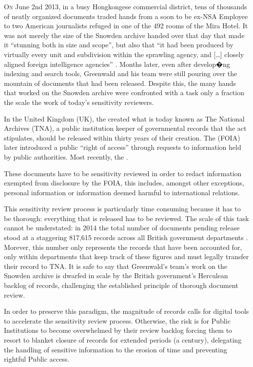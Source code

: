 \documentclass[\version]{l4proj}
\begin{document}
\lettrine[lines=3,nindent=0em]{O}{n} June 2nd 2013, in a busy Hongkongese commercial district, tens of thousands of neatly organized documents traded hands from a soon to be ex-NSA Employee to two American journalists refuged in one of the 492 rooms of the Mira Hotel.
It was not merely the size of the Snowden archive handed over that day that made it ``stunning both in size and scope'', but also that ``it had been produced by virtually every unit and subdivision within the sprawling agency, and [\ldots] closely aligned foreign intelligence agencies'' \autocite[77]{greenwaldNoPlaceHide2014}.
Months later, even after develop�ng indexing and search tools, Greenwald and his team were still pouring over the mountain of documents that had been released.
Despite this, the many hands that worked on the Snowden archive were confronted with a task only a fraction the scale the work of today's sensitivity reviewers.

In the United Kingdom (UK), the \textcite{PublicRecordsAct1958} created what is today known as The National Archives (TNA), a public institution keeper of governmental records that the act stipulates, should be released within thirty years of their creation.
The \textcite{FreedomInformationAct2000} (FOIA) later introduced a public ``right of access'' through requests to information held by public authorities.
Most recently, the \textcite{ConstitutionalReformGovernance2010}.

These documents have to be sensitivity reviewed in order to redact information exempted from disclosure by the FOIA, this includes, amongst other exceptions, personal information or information deemed harmful to international relations.

This sensitivity review process is particularly time consuming because it has to be thorough: everything that is released has to be reviewed.
The scale of this task cannot be understated: in 2014 the total number of documents pending release stood at a staggering 817,615 records across all British government departments \autocite{allanRecordsReview2014,thenationalarchivesRecordTransferReport2014}.
Morever, this number only represents the records that have been accounted for, only within departments that keep track of these figures and must legally transfer their record to TNA.
It is safe to say that Greenwald's team's work on the Snowden archive is dwarfed in scale by the British government's Herculean backlog of records, challenging the established principle of thorough document review.

In order to preserve this paradigm, the magnitude of records calls for digital tools to accelerate the sensitivity review process.
Otherwise, the risk is for Public Institutions to become overwhelmed by their review backlog forcing them to resort to blanket closure of records for extended periods (a century), delegating the handling of sensitive information to the erosion of time and preventing rightful Public access.
\end{document}
